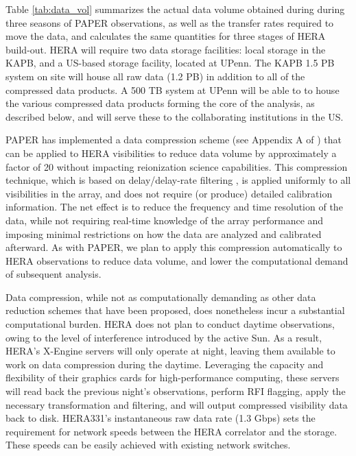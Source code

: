 \documentclass[preprint]{aastex}
\begin{document}
Table \ref{tab:data_vol} summarizes the actual data volume obtained
during during three seasons of PAPER observations, as well as the
transfer rates required to move the data, and calculates the same
quantities for three stages of HERA build-out.  HERA will require two
data storage facilities: local storage in the KAPB, and a US-based
storage facility, located at UPenn. The KAPB 1.5 PB system on site
will house all raw data (1.2 PB) in addition to all of the compressed
data products. A 500 TB system at UPenn will be able to to house the
various compressed data products forming the core of the analysis, as
described below, and will serve these to the collaborating institutions
in the US.

PAPER has implemented a data compression scheme (see Appendix A of
\citealt{parsons_et_al2013}) that can be applied to HERA visibilities
to reduce data volume by approximately a factor of 20 without
impacting reionization science capabilities.  This compression
technique, which is based on delay/delay-rate filtering
\citep{parsons_backer2009}, is applied uniformly to all visibilities
in the array, and does not require (or produce) detailed calibration
information.  The net effect is to reduce the frequency and time
resolution of the data, while not requiring real-time knowledge of the
array performance and imposing minimal restrictions on how the data are
analyzed and calibrated afterward.  As with PAPER, we plan to apply
this compression automatically to HERA observations to reduce data
volume, and lower the computational demand of subsequent analysis.

Data compression, while not as computationally demanding as other data
reduction schemes that have been proposed, does nonetheless incur a
substantial computational burden.  HERA does not plan to conduct
daytime observations, owing to the level of interference introduced by
the active Sun.  As a result, HERA's X-Engine servers will only
operate at night, leaving them available to work on data compression
during the daytime.  Leveraging the capacity and flexibility of their
graphics cards for high-performance computing, these servers will read
back the previous night's observations, perform RFI flagging, apply
the necessary transformation and filtering, and will output compressed
visibility data back to disk.  HERA331's instantaneous raw data rate
(1.3 Gbps) sets the requirement for network speeds between the HERA
correlator and the storage. These speeds can be easily achieved with
existing network switches.
\end{document}
